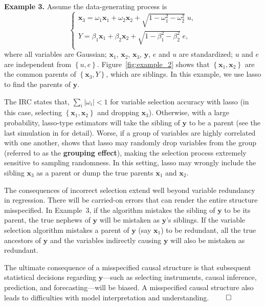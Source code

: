 \documentclass[11pt,review,authoryear]{elsarticle}
\begin{document}
\noindent
\textbf{Example 3.}\citep{zhaoyu06} Assume the data-generating process is
%
\begin{equation}
  \begin{cases}
    \mathbf{x}_3 = \omega_1 \mathbf{x}_1 + \omega_2 \mathbf{x}_2 + \sqrt{1 - \omega_1^2 - \omega_2^2} \; u, \\
    Y = \beta_1 \mathbf{x}_1 +  \beta_2 \mathbf{x}_2 + \sqrt{1 - \beta_1^2 - \beta_2^2} \; e, \\
  \end{cases}
  \label{eqn:example_3}
\end{equation}
%
where all variables are Gaussian; $\mathbf{x}_1$, $\mathbf{x}_2$, $\mathbf{x}_3$, $\mathbf{y}$, $e$ and $u$ are standardized; $u$ and $e$ are independent from $\left\{u, e\right\}$. Figure~\ref{fig:example_2} shows that $\left\{\mathbf{x}_1, \mathbf{x}_2\right\}$ are the common parents of $\left\{\mathbf{x}_3, Y\right\}$, which are siblings. In this example, we use lasso to find the parents of $\mathbf{y}$.

The IRC states that, $\sum_i \left\vert \omega_i \right\vert < 1$ for variable selection accuracy with lasso (in this case, selecting $\left\{\mathbf{x}_1, \mathbf{x}_2\right\}$ and dropping $\mathbf{x}_3$). Otherwise, with a large probability, lasso-type estimators will take the sibling of $\mathbf{y}$ to be a parent (see the last simulation in \citet{ning2019solar} for detail). Worse, if a group of variables are highly correlated with one another, \citet{zou2005regularization} shows that lasso may randomly drop variables from the group (referred to as the \textbf{grouping effect}), making the selection process extremely sensitive to sampling randomness. In this setting, lasso may wrongly include the sibling $\mathbf{x}_3$ as a parent or dump the true parents $\mathbf{x}_1$ and $\mathbf{x}_2$.

The consequences of incorrect selection extend well beyond variable redundancy in regression. There will be carried-on errors that can render the entire structure misspecified. In Example~3, if the algorithm mistakes the sibling of $\mathbf{y}$ to be its parent, the true nephews of $\mathbf{y}$ will be mistaken as $\mathbf{y}$'s siblings. If the variable selection algorithm mistakes a parent of $\mathbf{y}$ (say $\mathbf{x}_1$) to be redundant, all the true ancestors of $\mathbf{y}$ and the variables indirectly causing $\mathbf{y}$ will also be mistaken as redundant.

The ultimate consequence of a misspecified causal structure is that subsequent statistical decisions regarding $\mathbf{y}$---such as selecting instruments, causal inference, prediction, and forecasting---will be biased. A misspecified causal structure also leads to difficulties with model interpretation and understanding. $\qed$ \medskip
\end{document}
